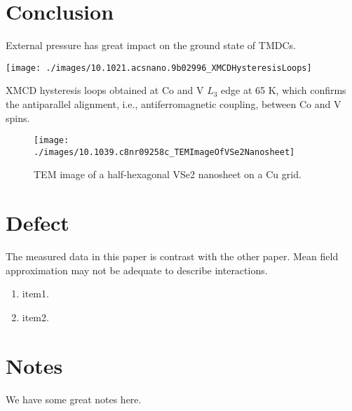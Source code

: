 \section{Conclusion}
External pressure has great impact on the ground state of TMDCs.

\begin{marginfigure}
    \texttt{[image: ./images/10.1021.acsnano.9b02996\_XMCDHysteresisLoops]}
	\caption[XMCD hysteresis loops obtained at Co and V $L_3$ edge at 65 K]{
        XMCD hysteresis loops obtained at Co and V $L_3$ edge at 65 K, which confirms the antiparallel alignment, i.e., antiferromagnetic coupling, between Co and V spins.
	}
\end{marginfigure}

\begin{figure}[ht] 
    \texttt{[image: ./images/10.1039.c8nr09258c\_TEMImageOfVSe2Nanosheet]}
	\caption[TEM image of a half-hexagonal VSe2 nanosheet on a Cu grid]{
		TEM image of a half-hexagonal VSe2 nanosheet on a Cu grid.
	}
\end{figure}

\section{Defect}
The measured data in this paper is contrast with the other paper. Mean field approximation may not be adequate to describe interactions.
\begin{enumerate}
    \item item1.
    \item item2.
\end{enumerate}

\section{Notes}
We have some great notes here.